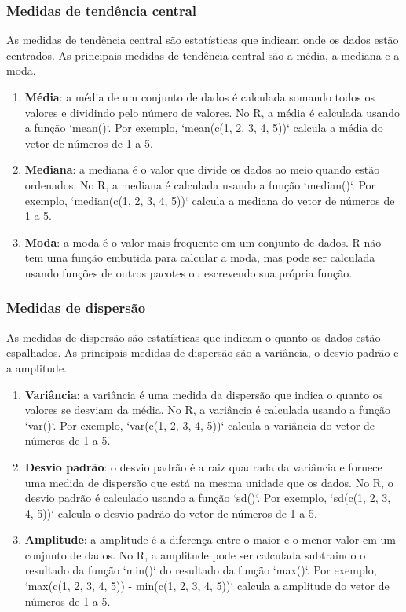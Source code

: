 \documentclass[
]{book}
\begin{document}
\subsubsection{Medidas de tendência central}\label{medidas-de-tenduxeancia-central-1}

As medidas de tendência central são estatísticas que indicam onde os dados estão centrados. As principais medidas de tendência central são a média, a mediana e a moda.

\begin{enumerate}
\def\labelenumi{\arabic{enumi}.}
\item
  \textbf{Média}: a média de um conjunto de dados é calculada somando todos os valores e dividindo pelo número de valores. No R, a média é calculada usando a função `mean()`. Por exemplo, `mean(c(1, 2, 3, 4, 5))` calcula a média do vetor de números de 1 a 5.
\item
  \textbf{Mediana}: a mediana é o valor que divide os dados ao meio quando estão ordenados. No R, a mediana é calculada usando a função `median()`. Por exemplo, `median(c(1, 2, 3, 4, 5))` calcula a mediana do vetor de números de 1 a 5.
\item
  \textbf{Moda}: a moda é o valor mais frequente em um conjunto de dados. R não tem uma função embutida para calcular a moda, mas pode ser calculada usando funções de outros pacotes ou escrevendo sua própria função.
\end{enumerate}

\subsubsection{Medidas de dispersão}\label{medidas-de-dispersuxe3o-1}

As medidas de dispersão são estatísticas que indicam o quanto os dados estão espalhados. As principais medidas de dispersão são a variância, o desvio padrão e a amplitude.

\begin{enumerate}
\def\labelenumi{\arabic{enumi}.}
\item
  \textbf{Variância}: a variância é uma medida da dispersão que indica o quanto os valores se desviam da média. No R, a variância é calculada usando a função `var()`. Por exemplo, `var(c(1, 2, 3, 4, 5))` calcula a variância do vetor de números de 1 a 5.
\item
  \textbf{Desvio padrão}: o desvio padrão é a raiz quadrada da variância e fornece uma medida de dispersão que está na mesma unidade que os dados. No R, o desvio padrão é calculado usando a função `sd()`. Por exemplo, `sd(c(1, 2, 3, 4, 5))` calcula o desvio padrão do vetor de números de 1 a 5.
\item
  \textbf{Amplitude}: a amplitude é a diferença entre o maior e o menor valor em um conjunto de dados. No R, a amplitude pode ser calculada subtraindo o resultado da função `min()` do resultado da função `max()`. Por exemplo, `max(c(1, 2, 3, 4, 5)) - min(c(1, 2, 3, 4, 5))` calcula a amplitude do vetor de números de 1 a 5.
\end{enumerate}
\end{document}
